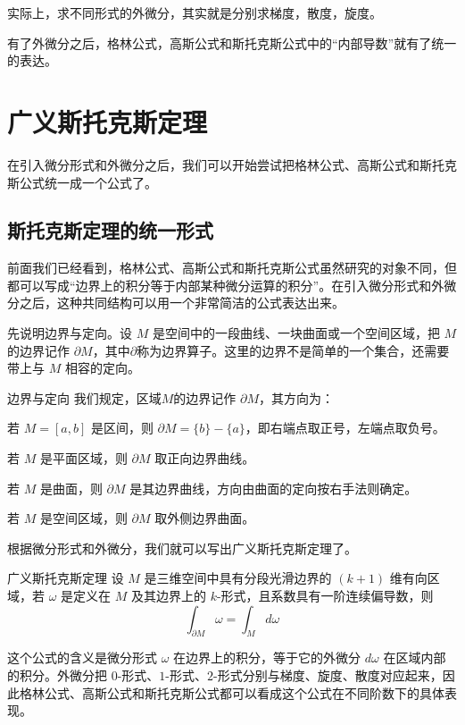 实际上，求不同形式的外微分，其实就是分别求梯度，散度，旋度。

有了外微分之后，格林公式，高斯公式和斯托克斯公式中的“内部导数”就有了统一的表达。
\section{广义斯托克斯定理}
在引入微分形式和外微分之后，我们可以开始尝试把格林公式、高斯公式和斯托克斯公式统一成一个公式了。

\subsection{斯托克斯定理的统一形式}
前面我们已经看到，格林公式、高斯公式和斯托克斯公式虽然研究的对象不同，但都可以写成“边界上的积分等于内部某种微分运算的积分”。在引入微分形式和外微分之后，这种共同结构可以用一个非常简洁的公式表达出来。

先说明边界与定向。设 \(M\) 是空间中的一段曲线、一块曲面或一个空间区域，把 \(M\) 的边界记作 \(\partial M\)，其中\(\partial\)称为边界算子。这里的边界不是简单的一个集合，还需要带上与 \(M\) 相容的定向。

\begin{definition}{边界与定向}{}
  我们规定，区域\(M\)的边界记作 \(\partial M\)，其方向为：
  
  若 \(M=[a,b]\) 是区间，则 \(\partial M=\{b\}-\{a\}\)，即右端点取正号，左端点取负号。

  若 \(M\) 是平面区域，则 \(\partial M\) 取正向边界曲线。

  若 \(M\) 是曲面，则 \(\partial M\) 是其边界曲线，方向由曲面的定向按右手法则确定。

  若 \(M\) 是空间区域，则 \(\partial M\) 取外侧边界曲面。
\end{definition}

根据微分形式和外微分，我们就可以写出广义斯托克斯定理了。

\begin{theorem}{广义斯托克斯定理}{}
设 \(M\) 是三维空间中具有分段光滑边界的 \((k+1)\) 维有向区域，若 \(\omega\) 是定义在 \(M\) 及其边界上的 \(k\)-形式，且系数具有一阶连续偏导数，则
\[
\int_{\partial M}\omega=\int_M d\omega
\]
\end{theorem}

这个公式的含义是微分形式 \(\omega\) 在边界上的积分，等于它的外微分 \(d\omega\) 在区域内部的积分。外微分把 \(0\)-形式、\(1\)-形式、\(2\)-形式分别与梯度、旋度、散度对应起来，因此格林公式、高斯公式和斯托克斯公式都可以看成这个公式在不同阶数下的具体表现。

